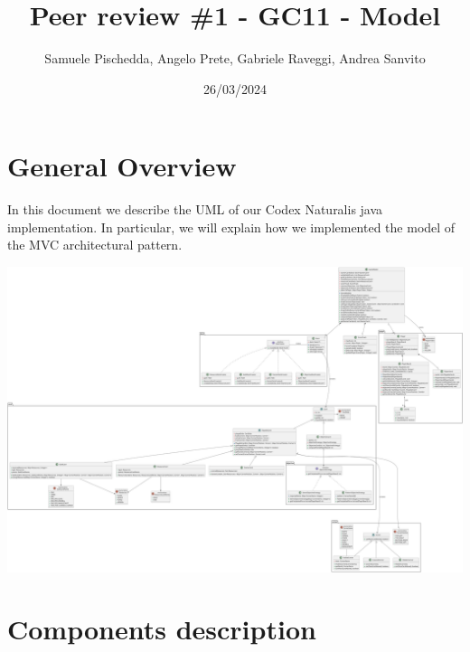 \documentclass{article}
\title{Peer review \#1 - GC11 - Model}
\author{Samuele Pischedda, Angelo Prete, Gabriele Raveggi, Andrea Sanvito }
\date{26/03/2024}
\begin{document}
\begin{titlepage}
\maketitle
\end{titlepage}

\section*{General Overview}
In this document we describe the UML of our Codex Naturalis java implementation. 
In particular, we will explain how we implemented the model of the MVC architectural pattern.
\begin{center}
    \hspace*{0.3cm}\includegraphics[scale=0.1]{model.png}
\end{center}


\newpage
\section*{Components description}
\setcounter{section}{1}
\end{document}
